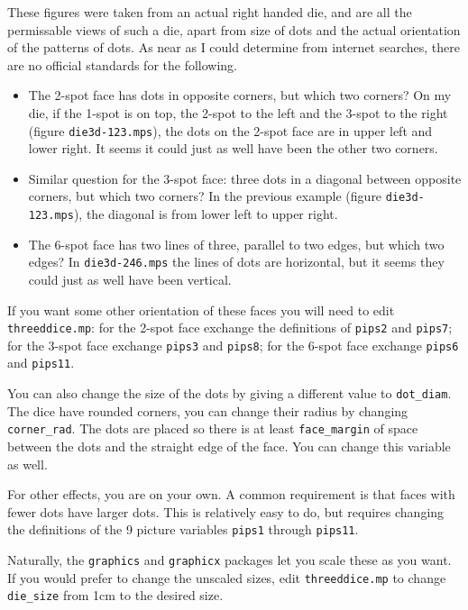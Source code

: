 \documentclass{article}
\begin{document}
These figures were taken from an actual right handed die, and are all
the permissable views of such a die, apart from size of dots and the
actual orientation of the patterns of dots. As near as I could determine
from internet searches, there are no official standards for the 
following. 
\begin{itemize}
  \item The 2-spot face has dots in opposite corners, but which two 
        corners? On my die, if the 1-spot is on top, the 2-spot to the 
        left and the 3-spot to the right (figure 
        \texttt{die3d-123.mps}), the dots on the 2-spot face are in 
        upper left and lower right. It seems it could just as well have 
        been the other two corners. 

  \item Similar question for the 3-spot face: three dots in a diagonal 
        between opposite corners, but which two corners? In the previous
        example (figure \texttt{die3d-123.mps}), the diagonal is from 
        lower left to upper right.

  \item The 6-spot face has two lines of three, parallel to two edges, 
        but which two edges? In \texttt{die3d-246.mps} the lines of dots are 
        horizontal, but it seems they could just as well have been 
        vertical.
\end{itemize}

If you want some other orientation of these faces you will need to edit 
\texttt{threeddice.mp}: for the 2-spot face exchange the definitions of 
\texttt{pips2} and \texttt{pips7}; for the 3-spot face exchange 
\texttt{pips3} and \texttt{pips8}; for the 6-spot face exchange 
\texttt{pips6} and \texttt{pips11}.

You can also change the size of the dots by giving a different value to 
\texttt{dot_diam}. The dice have rounded corners, you can change their
radius by changing \texttt{corner_rad}. The dots are placed so there is 
at least \texttt{face_margin} of space between the dots and the straight 
edge of the face. You can change this variable as well. 

For other effects, you are on your own. A common requirement is that 
faces with fewer dots have larger dots. This is relatively easy to do, 
but requires changing the definitions of the 9 picture variables 
\texttt{pips1} through \texttt{pips11}. 

Naturally, the \texttt{graphics} and \texttt{graphicx} packages let you 
scale these as you want. If you would prefer to change the unscaled 
sizes, edit \texttt{threeddice.mp} to change \texttt{die_size} from 1cm to 
the desired size.
\end{document}
